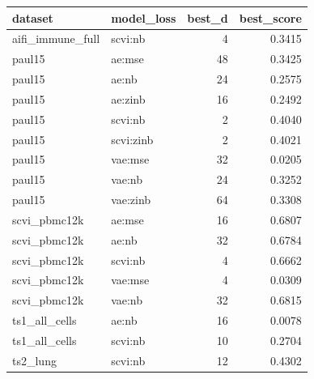 \begin{tabular}{llrr}
\toprule
dataset & model\_loss & best\_d & best\_score \\
\midrule
aifi\_immune\_full & scvi:nb & 4 & 0.3415 \\
paul15 & ae:mse & 48 & 0.3425 \\
paul15 & ae:nb & 24 & 0.2575 \\
paul15 & ae:zinb & 16 & 0.2492 \\
paul15 & scvi:nb & 2 & 0.4040 \\
paul15 & scvi:zinb & 2 & 0.4021 \\
paul15 & vae:mse & 32 & 0.0205 \\
paul15 & vae:nb & 24 & 0.3252 \\
paul15 & vae:zinb & 64 & 0.3308 \\
scvi\_pbmc12k & ae:mse & 16 & 0.6807 \\
scvi\_pbmc12k & ae:nb & 32 & 0.6784 \\
scvi\_pbmc12k & scvi:nb & 4 & 0.6662 \\
scvi\_pbmc12k & vae:mse & 4 & 0.0309 \\
scvi\_pbmc12k & vae:nb & 32 & 0.6815 \\
ts1\_all\_cells & ae:nb & 16 & 0.0078 \\
ts1\_all\_cells & scvi:nb & 10 & 0.2704 \\
ts2\_lung & scvi:nb & 12 & 0.4302 \\
\bottomrule
\end{tabular}
